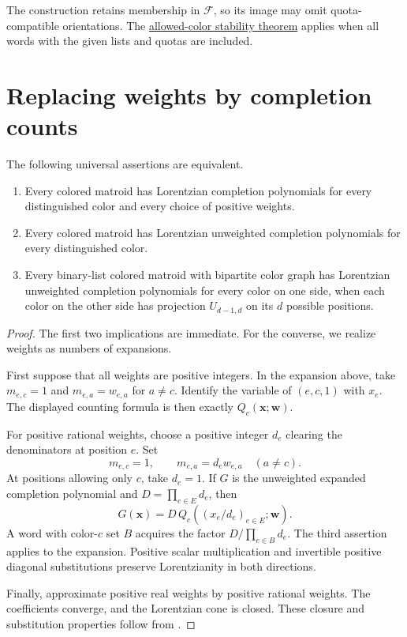 The construction retains membership in $\mathcal F$, so its image may
omit quota-compatible orientations. The
\href{series-parallel.htm#listStability}{allowed-color stability theorem}
applies when all words with the given lists and quotas are included.

\section[weightsToCounts]{Replacing weights by completion counts}

\begin{theorem}
The following universal assertions are equivalent.
\begin{enumerate}
\item Every colored matroid has Lorentzian completion polynomials
for every distinguished color and every choice of positive weights.
\item Every colored matroid has Lorentzian unweighted completion
polynomials for every distinguished color.
\item Every binary-list colored matroid with bipartite color graph
has Lorentzian unweighted completion polynomials for every color on
one side, when each color on the other side has projection
$U_{d-1,d}$ on its $d$ possible positions.
\end{enumerate}
\end{theorem}

\begin{proof}
The first two implications are immediate. For the converse, we realize
weights as numbers of expansions.

First suppose that all weights are positive integers. In the expansion
above, take $m_{e,c}=1$ and $m_{e,a}=w_{e,a}$ for $a\ne c$.
Identify the variable of $(e,c,1)$ with $x_e$. The displayed counting
formula is then exactly $Q_c(\mathbf x;\mathbf w)$.

For positive rational weights, choose a positive integer $d_e$ clearing
the denominators at position $e$. Set
\[
 m_{e,c}=1,\qquad m_{e,a}=d_e w_{e,a}\quad(a\ne c).
\]
At positions allowing only $c$, take $d_e=1$. If $G$ is the unweighted
expanded completion polynomial and $D=\prod_{e\in E}d_e$, then
\[
 G(\mathbf x)=D\,Q_c((x_e/d_e)_{e\in E};\mathbf w).
\]
A word with color-$c$ set $B$ acquires the factor
$D/\prod_{e\in B}d_e$. The third assertion applies to the expansion. Positive
scalar multiplication and invertible positive diagonal substitutions
preserve Lorentzianity in both directions.

Finally, approximate positive real weights by positive rational weights.
The coefficients converge, and the Lorentzian cone is closed. These
closure and substitution properties follow from
\cite[Theorems~2.10 and 2.25]{BrandenHuh2020}.
\end{proof}

